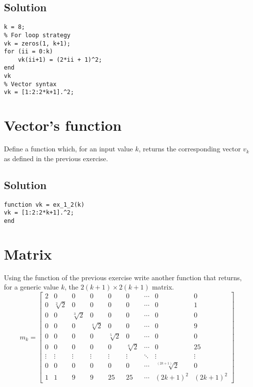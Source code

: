 \documentclass[12pt, a4paper]{report}
\begin{document}
    \subsection*{Solution}
        \begin{lstlisting}[style=Matlab]
k = 8;
% For loop strategy
vk = zeros(1, k+1);
for (ii = 0:k)
    vk(ii+1) = (2*ii + 1)^2;
end
vk
% Vector syntax
vk = [1:2:2*k+1].^2;            
        \end{lstlisting}  

    \newpage

    \section{Vector's function}
        Define a function which, for an input value $k$, returns the corresponding vector $v_k$ as defined in the previous exercise.
    \subsection*{Solution}
        \begin{lstlisting}[style=Matlab]
function vk = ex_1_2(k)
vk = [1:2:2*k+1].^2;
end
        \end{lstlisting}

    \newpage

    \section{Matrix}
        Using the function of the previous exercise write another function that returns, for a generic value $k$, the $2(k + 1) \times 2(k + 1)$ matrix.
        \[
            m_k=
            \begin{bmatrix}
                2 & 0 & 0 & 0 & 0 & 0 & \cdots & 0 & 0 \\
                0 & \sqrt[2]{2} & 0 & 0 & 0 & 0 & \cdots & 0 & 1 \\
                0 & 0 & \sqrt[3]{2} & 0 & 0 & 0 & \cdots & 0 & 0 \\
                0 & 0 & 0 & \sqrt[4]{2} & 0 & 0 & \cdots & 0 & 9 \\
                0 & 0 & 0 & 0 & \sqrt[5]{2} & 0 & \cdots & 0 & 0 \\
                0 & 0 & 0 & 0 & 0 & \sqrt[6]{2} & \cdots & 0 & 25 \\
                \vdots  & \vdots  & \vdots  & \vdots  & \vdots  & \vdots  & \ddots & \vdots  & \vdots  \\
                0 & 0 & 0 & 0 & 0 & 0 & \cdots & \sqrt[(2k+1)]{2} & 0 \\
                1 & 1 & 9 & 9 & 25 & 25 & \cdots & (2k+1)^2 & (2k+1)^2 
            \end{bmatrix} 
        \]
\end{document}
